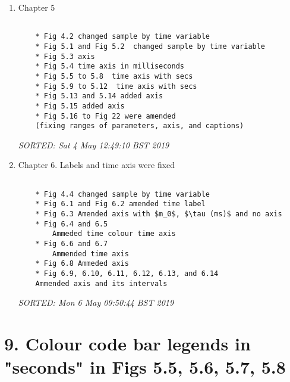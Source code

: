 \documentclass[12pt]{article}
\begin{document}
\begin{enumerate}

\item  Chapter 5 
	\begin{verbatim}

	* Fig 4.2 changed sample by time variable 
	* Fig 5.1 and Fig 5.2  changed sample by time variable 
	* Fig 5.3 axis 
	* Fig 5.4 time axis in milliseconds
	* Fig 5.5 to 5.8  time axis with secs
	* Fig 5.9 to 5.12  time axis with secs
	* Fig 5.13 and 5.14 added axis 
	* Fig 5.15 added axis
	* Fig 5.16 to Fig 22 were amended
	(fixing ranges of parameters, axis, and captions)
	\end{verbatim}
	\textit{
	SORTED:  Sat  4 May 12:49:10 BST 2019
	}
	\\
\item  Chapter 6. 
	Labels and time axis were fixed
	\begin{verbatim}

	* Fig 4.4 changed sample by time variable 
	* Fig 6.1 and Fig 6.2 amended time label
	* Fig 6.3 Amended axis with $m_0$, $\tau (ms)$ and no axis
	* Fig 6.4 and 6.5
		Ammeded time colour time axis
	* Fig 6.6 and 6.7
		Ammended time axis
	* Fig 6.8 Ammeded axis
	* Fig 6.9, 6.10, 6.11, 6.12, 6.13, and 6.14
	Ammended axis and its intervals
	\end{verbatim}
	\textit{
	SORTED: Mon  6 May 09:50:44 BST 2019
	}
	\\




\end{enumerate}




\section*{9. 
Colour code bar legends in "seconds"
in Figs 5.5, 5.6, 5.7, 5.8
}
\end{document}
